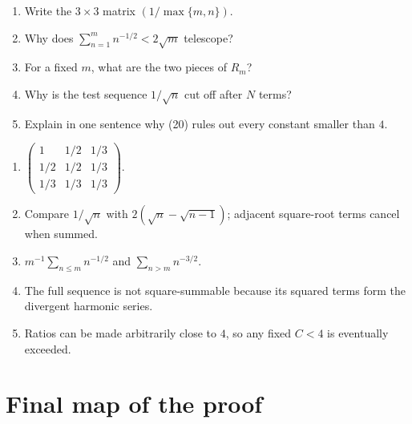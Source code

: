 \documentclass[11pt]{article}
\begin{document}
\begin{enumerate}
  \item Write the \(3\times3\) matrix \((1/\max\{m,n\})\).
  \item Why does \(\sum_{n=1}^{m}n^{-1/2}<2\sqrt m\) telescope?
  \item For a fixed \(m\), what are the two pieces of \(R_m\)?
  \item Why is the test sequence \(1/\sqrt n\) cut off after \(N\) terms?
  \item Explain in one sentence why (20) rules out every constant smaller than \(4\).
\end{enumerate}

\begin{definitionBox}[Answers]
\begin{enumerate}
  \item
  \(
  \begin{pmatrix}
  1&1/2&1/3\\
  1/2&1/2&1/3\\
  1/3&1/3&1/3
  \end{pmatrix}.
  \)
  \item Compare \(1/\sqrt n\) with \(2(\sqrt n-\sqrt{n-1})\); adjacent square-root terms cancel when summed.
  \item
  \(
  m^{-1}\sum_{n\leq m}n^{-1/2}
  \)
  and
  \(
  \sum_{n>m}n^{-3/2}.
  \)
  \item The full sequence is not square-summable because its squared terms form the divergent harmonic series.
  \item Ratios can be made arbitrarily close to \(4\), so any fixed \(C<4\) is eventually exceeded.
\end{enumerate}
\end{definitionBox}

\newpage
\section{Final map of the proof}
\end{document}
